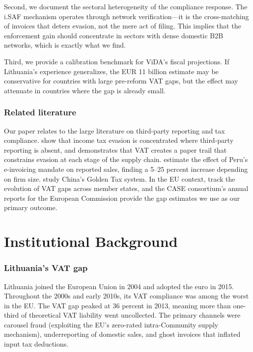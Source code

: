 \documentclass[12pt]{article}
\begin{document}
Second, we document the sectoral heterogeneity of the compliance response. The i.SAF mechanism operates through network verification---it is the cross-matching of invoices that deters evasion, not the mere act of filing. This implies that the enforcement gain should concentrate in sectors with dense domestic B2B networks, which is exactly what we find.

Third, we provide a calibration benchmark for ViDA's fiscal projections. If Lithuania's experience generalizes, the EUR 11 billion estimate may be conservative for countries with large pre-reform VAT gaps, but the effect may attenuate in countries where the gap is already small.

\subsubsection*{Related literature} Our paper relates to the large literature on third-party reporting and tax compliance. \citet{Kleven2011} show that income tax evasion is concentrated where third-party reporting is absent, and \citet{Pomeranz2015} demonstrates that VAT creates a paper trail that constrains evasion at each stage of the supply chain. \citet{Bellon2022} estimate the effect of Peru's e-invoicing mandate on reported sales, finding a 5--25 percent increase depending on firm size. \citet{Fan2018} study China's Golden Tax system. In the EU context, \citet{Poniatowski2022} track the evolution of VAT gaps across member states, and the CASE consortium's annual reports for the European Commission provide the gap estimates we use as our primary outcome.

\section{Institutional Background}

\subsubsection*{Lithuania's VAT gap} Lithuania joined the European Union in 2004 and adopted the euro in 2015. Throughout the 2000s and early 2010s, its VAT compliance was among the worst in the EU. The VAT gap peaked at 36 percent in 2013, meaning more than one-third of theoretical VAT liability went uncollected. The primary channels were carousel fraud (exploiting the EU's zero-rated intra-Community supply mechanism), underreporting of domestic sales, and ghost invoices that inflated input tax deductions.
\end{document}
